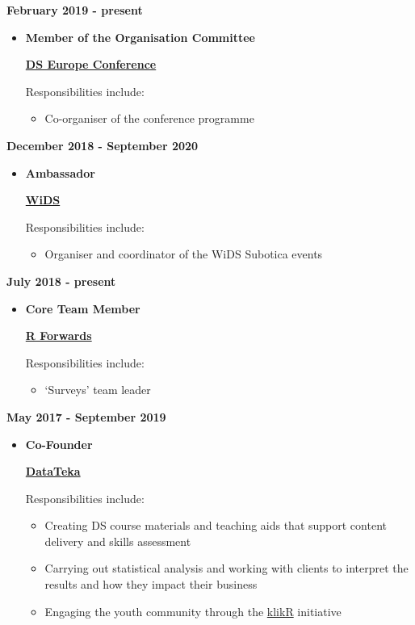 \documentclass[
]{article}
\providecommand{\tightlist}{%
  \setlength{\itemsep}{0pt}\setlength{\parskip}{0pt}}
\begin{document}
\textbf{February 2019 - present}

\begin{itemize}
\item
  \textbf{Member of the Organisation Committee}

  \href{https://datasciconference.com/}{\textbf{DS Europe Conference}}

  Responsibilities include:

  \begin{itemize}
  \tightlist
  \item
    Co-organiser of the conference programme
  \end{itemize}
\end{itemize}

\textbf{December 2018 - September 2020}

\begin{itemize}
\item
  \textbf{Ambassador}

  \href{https://www.widsconference.org/}{\textbf{WiDS}}

  Responsibilities include:

  \begin{itemize}
  \tightlist
  \item
    Organiser and coordinator of the WiDS Subotica events
  \end{itemize}
\end{itemize}

\textbf{July 2018 - present}

\begin{itemize}
\item
  \textbf{Core Team Member}

  \href{https://forwards.github.io/}{\textbf{R Forwards}}

  Responsibilities include:

  \begin{itemize}
  \tightlist
  \item
    `Surveys' team leader
  \end{itemize}
\end{itemize}

\textbf{May 2017 - September 2019}

\begin{itemize}
\item
  \textbf{Co-Founder}

  \href{https://www.datateka.com}{\textbf{DataTeka}}

  Responsibilities include:

  \begin{itemize}
  \tightlist
  \item
    Creating DS course materials and teaching aids that support content
    delivery and skills assessment
  \item
    Carrying out statistical analysis and working with clients to
    interpret the results and how they impact their business
  \item
    Engaging the youth community through the
    \href{http://klikr.rbind.io}{klikR} initiative
  \end{itemize}
\end{itemize}
\end{document}
